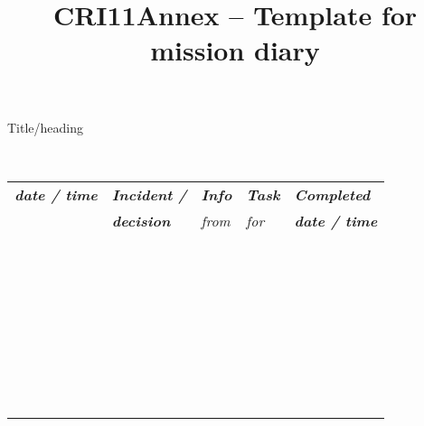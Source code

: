 \documentclass{article}
\begin{document}
\title{CRI11Annex – Template for mission diary}

\maketitle





Title/heading


 


\begin{tabu} to \textwidth { |X|X|X|X|X| }
\hline



\emph{\textbf{date / time}} & \emph{\textbf{Incident /}} & \emph{\textbf{Info}} & \emph{\textbf{Task}} & \emph{\textbf{Completed}}
 \\


 & \emph{\textbf{decision}} & \emph{from} & \emph{for} & \emph{\textbf{date / time}}
 \\


  &   &   &   & 
 \\


  &   &   &   &  
 \\


  &   &   &   &  
 \\


  &   &   &   &  
 \\


  &   &   &   &  
 \\


  &   &   &   &  
 \\


  &   &   &   &  
 \\
\hline

\end{tabu}
\end{document}
